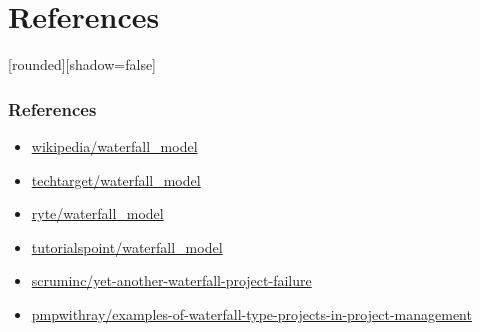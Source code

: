 \documentclass[10pt]{beamer}
\begin{document}
\section{References}
\begin{frame}
    [rounded][shadow=false]
    \frametitle{References}
    \begin{itemize}

        \item \href{https://en.wikipedia.org/wiki/Waterfall_model}{wikipedia/waterfall\_model}
            
        \item \href{https://www.techtarget.com/searchsoftwarequality/definition/waterfall-model}{techtarget/waterfall\_model}
            
        \item \href{https://en.ryte.com/wiki/Waterfall_Model}{ryte/waterfall\_model}
        
        \item \href{https://www.tutorialspoint.com/sdlc/sdlc_waterfall_model.htm}{tutorialspoint/waterfall\_model}

        \item \href{https://www.scruminc.com/yet-another-waterfall-project-failure/}{scruminc/yet-another-waterfall-project-failure}
         
        \item \href{https://www.pmpwithray.com/examples-of-waterfall-type-projects-in-project-management/}{pmpwithray/examples-of-waterfall-type-projects-in-project-management}
            
    \end{itemize}

\end{frame}
\end{document}
